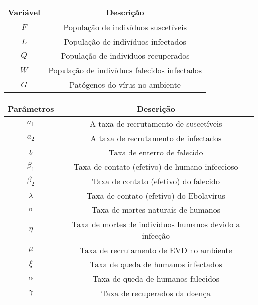 \documentclass[12pt,a4paper]{article}
\begin{document}
\begin{center}
\begin{tabular}{||c c||} 
 \hline
 Variável & Descrição\\ [0.5ex] 
 \hline\hline
 $F$ & População de indivíduos suscetíveis  \\ 
 \hline
 $L$ & População de indivíduos infectados  \\
 \hline
 $Q$ & População de indivíduos  recuperados\\
 \hline
 $W$ & População de indivíduos falecidos infectados \\
 \hline
 $G$ & Patógenos do vírus no ambiente \\
 \hline
\end{tabular}
\end{center}
\begin{center}
\begin{tabular}{||c c||} 
 \hline
 Parâmetros & Descrição\\ [0.5ex] 
 \hline\hline
 $a_1$ & A taxa de recrutamento de suscetíveis  \\ 
 \hline
 $a_2$ & A taxa de recrutamento de infectados  \\
 \hline
 $b$ & Taxa de enterro de falecido \\
 \hline
 $\beta_1$ & Taxa de contato (efetivo) de humano infeccioso \\
 \hline
 $\beta_2$ & Taxa de contato (efetivo) do falecido\\
 \hline
 $\lambda$ & Taxa de contato (efetivo) do Ebolavírus \\[1ex]
 \hline
 $\sigma$ & Taxa de mortes naturais de humanos\\
 \hline
 $\eta$ & Taxa de mortes de indivíduos humanos devido a infecção\\
 \hline
 $\mu$ & Taxa de recrutamento de EVD no ambiente\\
 \hline
 $\xi$ & Taxa de queda de humanos infectados\\
 \hline
 $\alpha$ & Taxa de queda de humanos falecidos\\ [1ex]
 \hline
 $\gamma$ & Taxa de recuperados da doença\\
 \hline
\end{tabular}
\end{center}

\vspace{4mm}
\end{document}
